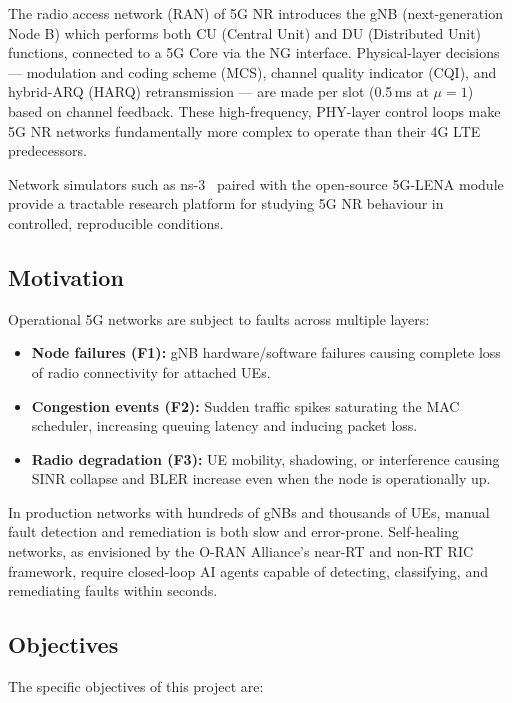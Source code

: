 \documentclass[12pt,a4paper]{article}
\begin{document}
The radio access network (RAN) of 5G NR introduces the gNB (next-generation
Node B) which performs both CU (Central Unit) and DU (Distributed Unit)
functions, connected to a 5G Core via the NG interface. Physical-layer
decisions --- modulation and coding scheme (MCS), channel quality indicator
(CQI), and hybrid-ARQ (HARQ) retransmission --- are made per slot (0.5\,ms at
\(\mu=1\)) based on channel feedback. These high-frequency, PHY-layer
control loops make 5G NR networks fundamentally more complex to operate than
their 4G LTE predecessors.

Network simulators such as ns-3~\cite{ns3} paired with the open-source
5G-LENA module~\cite{5glena} provide a tractable research platform for studying
5G NR behaviour in controlled, reproducible conditions.

\subsection{Motivation}

Operational 5G networks are subject to faults across multiple layers:

\begin{itemize}[noitemsep]
  \item \textbf{Node failures (F1):} gNB hardware/software failures causing
    complete loss of radio connectivity for attached UEs.
  \item \textbf{Congestion events (F2):} Sudden traffic spikes saturating the
    MAC scheduler, increasing queuing latency and inducing packet loss.
  \item \textbf{Radio degradation (F3):} UE mobility, shadowing, or
    interference causing SINR collapse and BLER increase even when the node
    is operationally up.
\end{itemize}

In production networks with hundreds of gNBs and thousands of UEs, manual
fault detection and remediation is both slow and error-prone. Self-healing
networks, as envisioned by the O-RAN Alliance's near-RT and non-RT RIC
framework, require closed-loop AI agents capable of detecting, classifying,
and remediating faults within seconds.

\subsection{Objectives}

The specific objectives of this project are:
\end{document}
